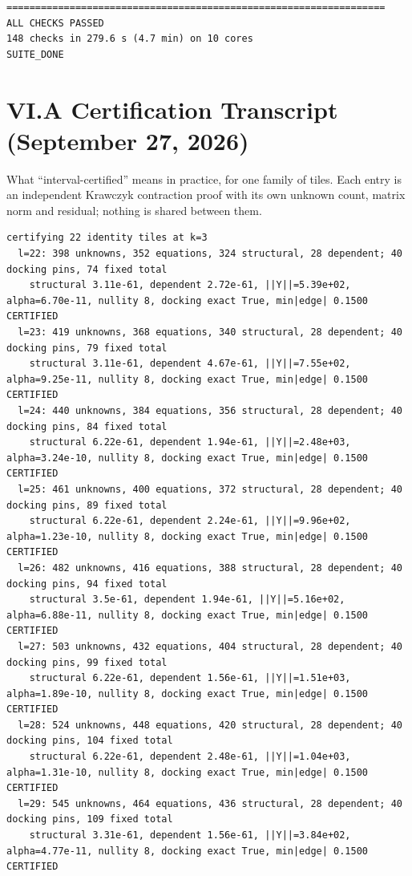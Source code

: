 \documentclass[11pt]{article}
\begin{document}
\begin{verbatim}
==================================================================
ALL CHECKS PASSED
148 checks in 279.6 s (4.7 min) on 10 cores
SUITE_DONE

\end{verbatim}\endgroup
\newpage
\section*{VI.\quad A Certification Transcript \hfill\normalsize\normalfont(September 27, 2026)}
What ``interval-certified'' means in practice, for one family of tiles. Each
entry is an independent Krawczyk contraction proof with its own unknown count,
matrix norm and residual; nothing is shared between them.
\begingroup\scriptsize\begin{verbatim}
certifying 22 identity tiles at k=3
  l=22: 398 unknowns, 352 equations, 324 structural, 28 dependent; 40 docking pins, 74 fixed total
    structural 3.11e-61, dependent 2.72e-61, ||Y||=5.39e+02, alpha=6.70e-11, nullity 8, docking exact True, min|edge| 0.1500  CERTIFIED
  l=23: 419 unknowns, 368 equations, 340 structural, 28 dependent; 40 docking pins, 79 fixed total
    structural 3.11e-61, dependent 4.67e-61, ||Y||=7.55e+02, alpha=9.25e-11, nullity 8, docking exact True, min|edge| 0.1500  CERTIFIED
  l=24: 440 unknowns, 384 equations, 356 structural, 28 dependent; 40 docking pins, 84 fixed total
    structural 6.22e-61, dependent 1.94e-61, ||Y||=2.48e+03, alpha=3.24e-10, nullity 8, docking exact True, min|edge| 0.1500  CERTIFIED
  l=25: 461 unknowns, 400 equations, 372 structural, 28 dependent; 40 docking pins, 89 fixed total
    structural 6.22e-61, dependent 2.24e-61, ||Y||=9.96e+02, alpha=1.23e-10, nullity 8, docking exact True, min|edge| 0.1500  CERTIFIED
  l=26: 482 unknowns, 416 equations, 388 structural, 28 dependent; 40 docking pins, 94 fixed total
    structural 3.5e-61, dependent 1.94e-61, ||Y||=5.16e+02, alpha=6.88e-11, nullity 8, docking exact True, min|edge| 0.1500  CERTIFIED
  l=27: 503 unknowns, 432 equations, 404 structural, 28 dependent; 40 docking pins, 99 fixed total
    structural 6.22e-61, dependent 1.56e-61, ||Y||=1.51e+03, alpha=1.89e-10, nullity 8, docking exact True, min|edge| 0.1500  CERTIFIED
  l=28: 524 unknowns, 448 equations, 420 structural, 28 dependent; 40 docking pins, 104 fixed total
    structural 6.22e-61, dependent 2.48e-61, ||Y||=1.04e+03, alpha=1.31e-10, nullity 8, docking exact True, min|edge| 0.1500  CERTIFIED
  l=29: 545 unknowns, 464 equations, 436 structural, 28 dependent; 40 docking pins, 109 fixed total
    structural 3.31e-61, dependent 1.56e-61, ||Y||=3.84e+02, alpha=4.77e-11, nullity 8, docking exact True, min|edge| 0.1500  CERTIFIED

\end{verbatim}
\end{document}
